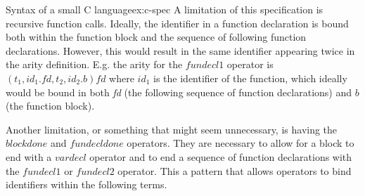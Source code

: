 \begin{example}{Syntax of a small C language}{ex:c-spec}
  A limitation of this specification is recursive function calls. Ideally, the identifier in a function declaration is bound both within the function block and the sequence of following function declarations. However, this would result in the same identifier appearing twice in the arity definition. E.g. the arity for the $\textit{fundecl1}$ operator is $(t_1,id_1.\textit{fd},t_2,id_2.b)fd$ where $id_1$ is the identifier of the function, which ideally would be bound in both \textit{fd} (the following sequence of function declarations) and $b$ (the function block).

  Another limitation, or something that might seem unnecessary, is having the $blockdone$ and $fundecldone$ operators. They are necessary to allow for a block to end with a $vardecl$ operator and to end a sequence of function declarations with the $fundecl1$ or $fundecl2$ operator. This a pattern that allows operators to bind identifiers within the following terms.

\end{example}
